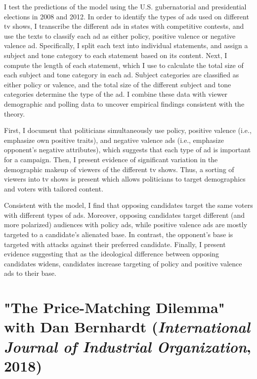 \documentclass[12pt]{article}
\begin{document}
I test the predictions of the model using the U.S. gubernatorial and presidential elections in 2008 and 2012.
In order to identify the types of ads used on different tv shows, I transcribe the different ads in states with competitive contests,
and use the texts to classify each ad as either policy, positive valence or negative valence ad.
Specifically, I split each text into individual statements, and assign a subject and tone category to each statement based on its content. 
Next, I compute the length of each statement, which I use to calculate the total size of each subject and tone category in each ad.
Subject categories are classified as either policy or valence, and the total size of the different subject and tone categories determine the type of the ad.
I combine these data with viewer demographic and polling data to uncover empirical findings consistent with the theory.


First, I document that politicians simultaneously use policy, positive valence (i.e., emphasize own positive traits), and negative valence ads (i.e., emphasize opponent's negative attributes),
which suggests that each type of ad is important for a campaign.
Then, I present evidence of significant variation in the demographic makeup of viewers of the different tv shows.
Thus, a sorting of viewers into tv shows is present which allows politicians to target demographics and voters with tailored content.

Consistent with the model, I find that opposing candidates target the same voters with different types of ads.
Moreover, opposing candidates target different (and more polarized) audiences with policy ads, while positive valence ads are mostly targeted to a candidate’s alienated base.
In contrast, the opponent's base is targeted with attacks against their preferred candidate.
Finally, I present evidence suggesting that as the ideological difference between opposing candidates widens,
candidates increase targeting of policy and positive valence ads to their base.






\vspace{0.5cm}

\section{"The Price-Matching Dilemma" with Dan Bernhardt (\emph{International Journal of Industrial Organization}, 2018)}
\label{sec:org1439864}
\vspace{0.25cm}
\end{document}
